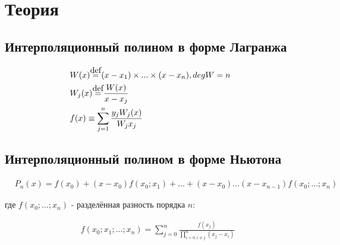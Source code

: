 \documentclass[../main.tex]{subfiles}
\begin{document}
\section{Теория}

\subsection{Интерполяционный полином в форме Лагранжа}


\newcommand\myeq{\stackrel{\mathclap{\normalfont\mbox{def}}}{=}}

\begin{align*}
    & W(x) \myeq (x - x_1) \times ... \times (x - x_n), deg W = n & \\
    & W_j(x) \myeq \frac{W(x)}{x - x_j} & \\
    & f(x) \equiv \sum_{j=1}^{n} \frac{y_j W_j(x)}{W_j{x_j}} &
\end{align*}

\subsection{Интерполяционный полином в форме Ньютона}

\begin{align*}
    & P_n(x) = f(x_0) + (x-x_0)f(x_0;x_1) + ... + (x-x_0)...(x-x_{n-1})f(x_0;...;x_n)
\end{align*}

где $f(x_0;...;x_n)$ - разделённая разность порядка $n$:

\begin{align*}
    & f(x_0; x_1; ...; x_n) = \sum_{j=0}^n \frac{f(x_j)}{\prod_{i=0, i \neq j}^n (x_j - x_i)}
\end{align*}
\end{document}
